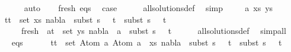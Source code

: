 \begin{isabellebody}
\ \ \ \ \ \isamarkupfalse%
\ auto\isanewline
\ \ \isamarkupfalse%
\ fresh\ eqs\ \isamarkupfalse%
\ {\isacharquery}{\kern0pt}case\isanewline
\ \ \ \ \isamarkupfalse%
\ all{\isacharunderscore}{\kern0pt}solutions{\isacharunderscore}{\kern0pt}def\ \isamarkupfalse%
\ simp\isanewline
{}\isamarkupfalse%
\isanewline
\ \ \isamarkupfalse%
\ {\isacharparenleft}{\kern0pt}{}\ a\ xs\ ys{\isacharparenright}{\kern0pt}\isanewline
\ \ \isamarkupfalse%
\ {\isachardoublequoteopen}{\isasymforall}\ {\isacharparenleft}{\kern0pt}t{}{\isacharcomma}{\kern0pt}t{}{\isacharparenright}{\kern0pt}\ {\isasymin}\ set\ xs{\isachardot}{\kern0pt}\ nabla{}\ {\isasymturnstile}\ subst\ {\isacharparenleft}{\kern0pt}s{}\ {\isasymbullet}\ {\isacharbrackleft}{\kern0pt}{\isacharbrackright}{\kern0pt}{\isacharparenright}{\kern0pt}\ t{}\ {\isasymapprox}\ subst\ {\isacharparenleft}{\kern0pt}s{}\ {\isasymbullet}\ {\isacharbrackleft}{\kern0pt}{\isacharbrackright}{\kern0pt}{\isacharparenright}{\kern0pt}\ t{}{\isachardoublequoteclose}\ \isanewline
\ \ \ \ \ \ fresh{\isacharcolon}{\kern0pt}\ {\isachardoublequoteopen}{\isasymforall}\ {\isacharparenleft}{\kern0pt}a{\isacharcomma}{\kern0pt}t{\isacharparenright}{\kern0pt}\ {\isasymin}\ set\ ys{\isachardot}{\kern0pt}\ nabla{}\ {\isasymturnstile}\ a\ {\isasymsharp}\ subst\ {\isacharparenleft}{\kern0pt}s{}\ {\isasymbullet}\ {\isacharbrackleft}{\kern0pt}{\isacharbrackright}{\kern0pt}{\isacharparenright}{\kern0pt}\ t{\isachardoublequoteclose}\isanewline
\ \ \ \ \isamarkupfalse%
\ all{\isacharunderscore}{\kern0pt}solutions{\isacharunderscore}{\kern0pt}def\ \isamarkupfalse%
\ simp{\isacharunderscore}{\kern0pt}all\isanewline
\ \ \isamarkupfalse%
\ eqs{\isacharcolon}{\kern0pt}\ \isanewline
\ \ \ \ {\isachardoublequoteopen}{\isasymforall}\ {\isacharparenleft}{\kern0pt}t{}{\isacharcomma}{\kern0pt}t{}{\isacharparenright}{\kern0pt}\ {\isasymin}\ set\ {\isacharparenleft}{\kern0pt}{\isacharparenleft}{\kern0pt}Atom\ a{\isacharcomma}{\kern0pt}\ Atom\ a{\isacharparenright}{\kern0pt}\ {\isacharhash}{\kern0pt}\ xs{\isacharparenright}{\kern0pt}{\isachardot}{\kern0pt}\ nabla{}\ {\isasymturnstile}\ subst\ {\isacharparenleft}{\kern0pt}s{}\ {\isasymbullet}\ {\isacharbrackleft}{\kern0pt}{\isacharbrackright}{\kern0pt}{\isacharparenright}{\kern0pt}\ t{}\ {\isasymapprox}\ subst\ {\isacharparenleft}{\kern0pt}s{}\ {\isasymbullet}\ {\isacharbrackleft}{\kern0pt}{\isacharbrackright}{\kern0pt}{\isacharparenright}{\kern0pt}\ t{}{\isachardoublequoteclose}\isanewline

\end{isabellebody}
